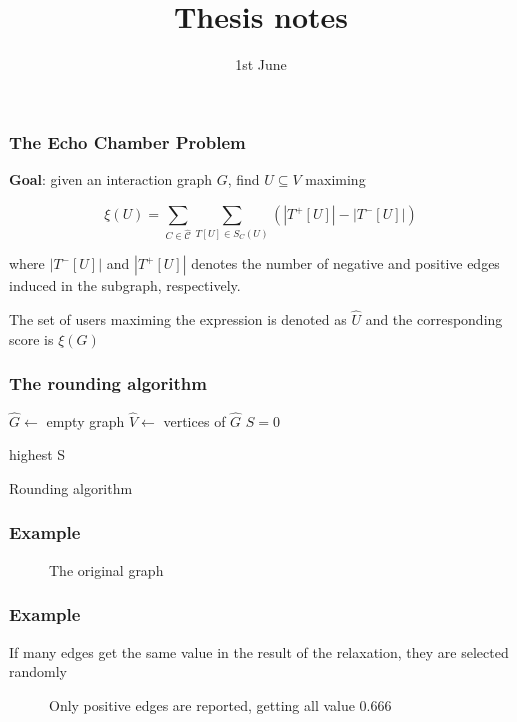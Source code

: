 \documentclass{beamer}
\title{Thesis notes}
\date{1st June}
\begin{document}
\frame{\titlepage}

\begin{frame}[c]
	\frametitle{The Echo Chamber Problem}
	\textbf{Goal}: given an interaction graph $G$, find $U \subseteq V$ maximing

	\begin{equation}
		\xi (U) = \sum^{}_{C \in \hat{\mathcal{C}} } \sum^{}_{T[U] \in S_C (U)}
		(| T^{+} [U] | - | T^{-} [U] |)
	\end{equation}

	where $| T^{-} [U] |$ and $| T^{+} [U] |$ denotes the number of negative
	and positive edges induced in the subgraph, respectively.

	\bigskip

	The set of users maximing the expression is denoted as $\hat{U}$ and the
	corresponding score is $\xi(G)$
\end{frame}


\begin{frame}[c]
	\frametitle{The rounding algorithm}
	\begin{algorithm}[H]
		\SetAlgoLined
		$\hat{G} \leftarrow $ empty graph \;
		$\hat{V} \leftarrow $ vertices of $\hat{G}$ \;
		$S = 0$


		\Return highest S \;

		\caption{Rounding algorithm}
		\label{alg:algorithm_rounding}
	\end{algorithm}
\end{frame}

\begin{frame}[c]
	\frametitle{Example}
	\begin{figure}[htpb]
		\centering
		\caption{The original graph}%
		\label{fig:name}
	\end{figure}
\end{frame}

\begin{frame}[c]
	\frametitle{Example}
	If many edges get the same value in the result of the relaxation, they are
	selected randomly

	\begin{figure}[htpb]
		\centering
		\caption{Only positive edges are reported, getting all value
			0.666}%
		\label{fig:name}
	\end{figure}

\end{frame}
\end{document}
